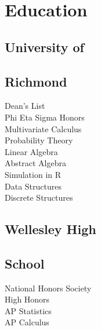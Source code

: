 \documentclass{resume}
\begin{document}

%
%

\begin{minipage}[t]{0.33\textwidth}


\section{Education}

\subsection{University of}
\subsection{Richmond}
Dean's List\\
Phi Eta Sigma Honors \\
{}
Multivariate Calculus\\
Probability Theory \\
Linear Algebra \\
Abstract Algebra\\
Simulation in R\\
Data Structures\\
Discrete Structures\\
\sectionsep

\subsection{Wellesley High}
\subsection{School}
National Honors Society\\
High Honors\\
{}
AP Statistics \\
AP Calculus \\




\end{minipage}
\end{document}
